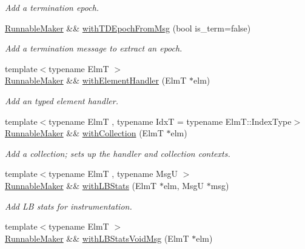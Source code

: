 \begin{DoxyCompactItemize}
\begin{DoxyCompactList}\small\item\em Add a termination epoch. \end{DoxyCompactList}\item 
\hyperlink{structvt_1_1runnable_1_1_runnable_maker}{Runnable\+Maker} \&\& \hyperlink{structvt_1_1runnable_1_1_runnable_maker_ab1d3e7c7e5da4cf309a58b0e4a17070e}{with\+T\+D\+Epoch\+From\+Msg} (bool is\+\_\+term=false)
\begin{DoxyCompactList}\small\item\em Add a termination message to extract an epoch. \end{DoxyCompactList}\item 
{\footnotesize template$<$typename ElmT $>$ }\\\hyperlink{structvt_1_1runnable_1_1_runnable_maker}{Runnable\+Maker} \&\& \hyperlink{structvt_1_1runnable_1_1_runnable_maker_a1b37afe7a5ab185c29e85e0d6ebbbc82}{with\+Element\+Handler} (ElmT $\ast$elm)
\begin{DoxyCompactList}\small\item\em Add an typed element handler. \end{DoxyCompactList}\item 
{\footnotesize template$<$typename ElmT , typename IdxT  = typename Elm\+T\+::\+Index\+Type$>$ }\\\hyperlink{structvt_1_1runnable_1_1_runnable_maker}{Runnable\+Maker} \&\& \hyperlink{structvt_1_1runnable_1_1_runnable_maker_aed99a9b0607da59ab7ad7ee56255fcc8}{with\+Collection} (ElmT $\ast$elm)
\begin{DoxyCompactList}\small\item\em Add a collection; sets up the handler and collection contexts. \end{DoxyCompactList}\item 
{\footnotesize template$<$typename ElmT , typename MsgU $>$ }\\\hyperlink{structvt_1_1runnable_1_1_runnable_maker}{Runnable\+Maker} \&\& \hyperlink{structvt_1_1runnable_1_1_runnable_maker_a92f6e8577ac1a9828a09bc64fe665b32}{with\+L\+B\+Stats} (ElmT $\ast$elm, MsgU $\ast$msg)
\begin{DoxyCompactList}\small\item\em Add LB stats for instrumentation. \end{DoxyCompactList}\item 
{\footnotesize template$<$typename ElmT $>$ }\\\hyperlink{structvt_1_1runnable_1_1_runnable_maker}{Runnable\+Maker} \&\& \hyperlink{structvt_1_1runnable_1_1_runnable_maker_acce9921f014ab7220f9d7b3ca57e75d5}{with\+L\+B\+Stats\+Void\+Msg} (ElmT $\ast$elm)

\end{DoxyCompactItemize}
